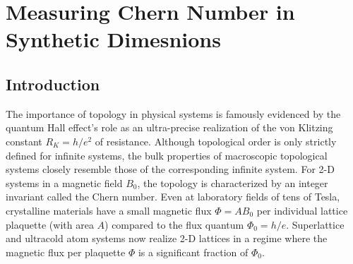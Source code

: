 \renewcommand{\thechapter}{7}

\chapter{Measuring Chern Number in Synthetic Dimesnions}


\section{Introduction}
	The importance of topology in physical systems is famously evidenced by the quantum Hall effect's role as an ultra-precise realization of the von Klitzing constant $R_K = h/e^2$ of resistance\cite{Klitzing1980}. Although topological order is only strictly defined for infinite systems, the bulk properties of macroscopic topological systems closely resemble those of the corresponding infinite system. For 2-D systems in a magnetic field $B_0$, the topology is characterized by an integer invariant called the Chern number. Even at laboratory fields of tens of Tesla, crystalline materials have a small magnetic flux $\Phi=AB_0$ per individual lattice plaquette (with area $A$) compared to the flux quantum $\Phi_0=h/e$. Superlattice \cite{Geisler2004,Melinte2004,Feil2007,Dean2013} and ultracold atom\cite{Miyake2013,Aidelsburger2013,Jotzu2014,An2017} systems now realize 2-D lattices in a regime where the magnetic flux per plaquette $\Phi$ is a significant fraction of $\Phi_0$. %

